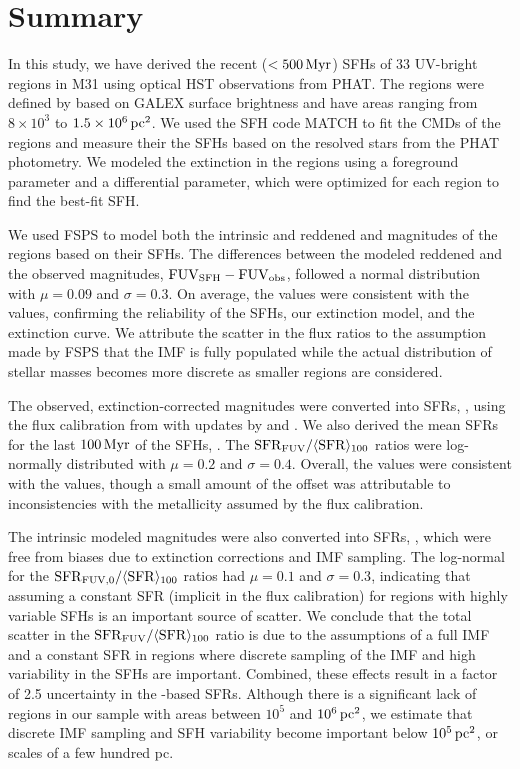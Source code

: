 \chapter{Summary}
\label{summary}

In this study, we have derived the recent ($< 500\,\mathrm{Myr}$) SFHs of 33
UV-bright regions in M31 using optical HST observations from PHAT. The regions
were defined by  based on GALEX \fuv{} surface brightness and
have areas ranging from $8 \times 10^3$ to $1.5 \times 10^6\,\mathrm{pc}^2$. We
used the SFH code MATCH to fit the CMDs of the regions and measure their the
SFHs based on the resolved stars from the PHAT photometry. We modeled the
extinction in the regions using a foreground parameter and a differential
parameter, which were optimized for each region to find the best-fit SFH.

We used FSPS to model both the intrinsic and reddened \fuv{} and \nuv{} magnitudes of
the regions based on their SFHs. The differences between the modeled reddened
and the observed \fuv{} magnitudes, $\mathrm{FUV}_{\mathrm{SFH}} - \mathrm{FUV}_{\mathrm{obs}}$, followed a
normal distribution with $\mu=0.09$ and $\sigma=0.3$. On average, the
\fuvsfh{} values were consistent with the \fuvobs{}
values, confirming the reliability of the SFHs, our extinction model, and the
\citet{Cardelli:1989} extinction curve. We attribute the scatter in the flux
ratios to the assumption made by FSPS that the IMF is fully populated while the
actual distribution of stellar masses becomes more discrete as smaller regions
are considered.

The observed, extinction-corrected \fuv{} magnitudes were converted into SFRs,
\sfrfuv{}, using the \fuv{} flux calibration from \citet{Kennicutt:1998}
with updates by \citet{Hao:2011} and \citet{Murphy:2011}. We also derived the mean
SFRs for the last $100\,\mathrm{Myr}$ of the SFHs, \sfroneh{}. The $\mathrm{SFR}_{\mathrm{FUV}} / \langle\mathrm{SFR}\rangle_{100}$
ratios were log-normally distributed with $\mu=0.2$
and $\sigma=0.4$. Overall, the \sfrfuv{} values were consistent with
the \sfroneh{} values, though a small amount of the
offset was attributable to inconsistencies with the metallicity assumed by the
flux calibration.

The intrinsic modeled \fuv{} magnitudes were also converted into SFRs,
\sfrfuvz{}, which were free from biases due to extinction
corrections and IMF sampling. The log-normal for the
$\mathrm{SFR}_{\mathrm{FUV},0} / \langle\mathrm{SFR}\rangle_{100}$ ratios had $\mu=0.1$
and $\sigma=0.3$, indicating that assuming a constant SFR (implicit in the flux
calibration) for regions with highly variable SFHs is an important source of
scatter. We conclude that the total scatter in the $\mathrm{SFR}_{\mathrm{FUV}} / \langle\mathrm{SFR}\rangle_{100}$ ratio
is due to the assumptions of a full IMF and a
constant SFR in regions where discrete sampling of the IMF and high variability
in the SFHs are important. Combined, these effects result in a factor of 2.5
uncertainty in the \fuv{}-based SFRs. Although there is a significant lack of
regions in our sample with areas between $10^5$ and $10^6\,\mathrm{pc}^2$, we
estimate that discrete IMF sampling and SFH variability become important below
$10^5\,\mathrm{pc}^2$, or scales of a few hundred pc.


